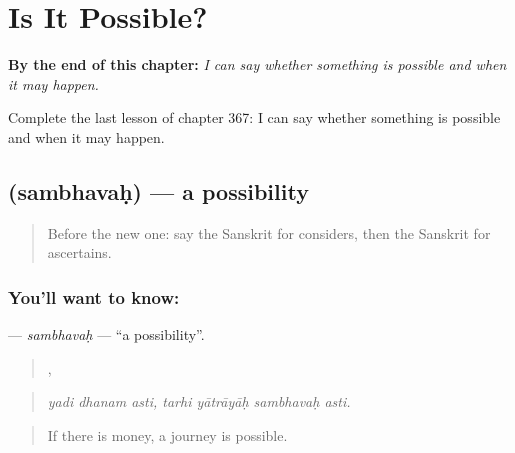 
\chapter{Is It Possible?}
\label{ch:sa-is-it-possible}

\begin{chapteropening}
\textbf{By the end of this chapter:} \emph{I can say whether something is possible and when it may happen.}

Complete the last lesson of chapter 367: I can say whether something is possible and when it may happen.
\end{chapteropening}

\section[\texorpdfstring{\sk{सम्भवः} (sambhavaḥ)}{सम्भवः (sambhavaḥ)}]{ (sambhavaḥ) — a possibility}

\label{lesson:SA-C367-sambhavah}



\begin{quote}
Before the new one: say the Sanskrit for considers, then the Sanskrit for ascertains.
\end{quote}

\subsection*{You'll want to know: }
\textbf{} — \emph{sambhavaḥ} — \textquotedblleft{}a possibility\textquotedblright{}.

\begin{quote}
  ,    
\end{quote}

\begin{quote}
\emph{yadi dhanam asti, tarhi yātrāyāḥ sambhavaḥ asti.}
\end{quote}

\begin{quote}
If there is money, a journey is possible.
\end{quote}

